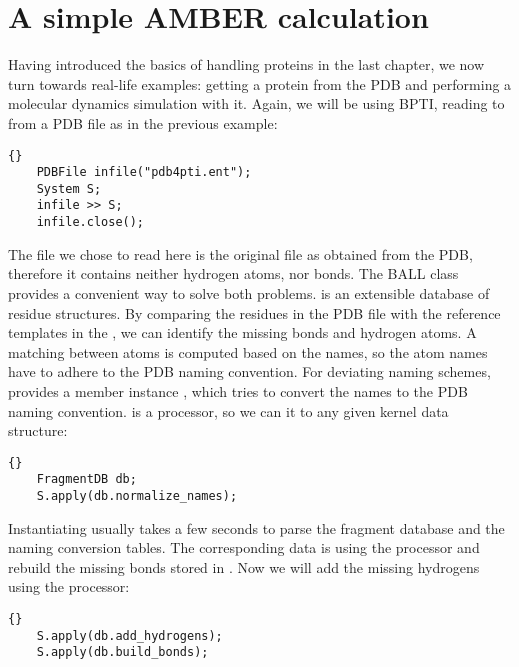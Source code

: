 \section{A simple AMBER calculation}


Having introduced the basics of handling proteins in the last
chapter, we now turn towards real-life examples: getting a protein
from the PDB and performing a molecular dynamics simulation with it.
Again, we will be using BPTI, reading to from a PDB file as in the
previous example:

\begin{lstlisting}{}
	PDBFile	infile("pdb4pti.ent");
	System S;
	infile >> S;
	infile.close();
\end{lstlisting}

\noindent
The file we chose to read here is the original file as obtained from
the PDB, therefore it contains neither hydrogen atoms, nor bonds.
The BALL class  provides a convenient way to solve
both problems.  is an extensible database of residue
structures. By comparing the residues in the PDB file with the reference
templates in the , we can identify the missing bonds
and hydrogen atoms. A matching between atoms is computed based on the names,
so the atom names have to adhere to the PDB naming convention.
For deviating naming schemes,  provides a member instance
, which tries to convert the names to the PDB 
naming convention.  is a processor, so we
can  it to any given kernel data structure:

\begin{lstlisting}{}
	FragmentDB db;
	S.apply(db.normalize_names);
\end{lstlisting}

\noindent
Instantiating  usually takes a few seconds to parse the 
fragment database and the naming conversion tables. The corresponding data is
using the  processor and rebuild the missing bonds
stored in . Now we will add the missing hydrogens 
using the  processor:

\begin{lstlisting}{}
	S.apply(db.add_hydrogens);
	S.apply(db.build_bonds);
\end{lstlisting}

